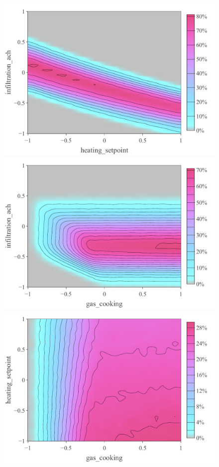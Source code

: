 \documentclass[a4paper, 12pt]{article}
\begin{document}
\begin{figure}
\centering
 \includegraphics[width=\scale]{Gas_Compatibility/Opt_Depth/Depth_MD=20_x=1_y=6}
 \includegraphics[width=\scale]{Gas_Compatibility/Opt_Depth/Depth_MD=20_x=8_y=6}\\
 \hspace{\scale}
 \includegraphics[width=\scale]{Gas_Compatibility/Opt_Depth/Depth_MD=20_x=8_y=1}
 \caption{}
 \label{Fig_Opt_Depth_20MD}
\end{figure}
\end{document}
